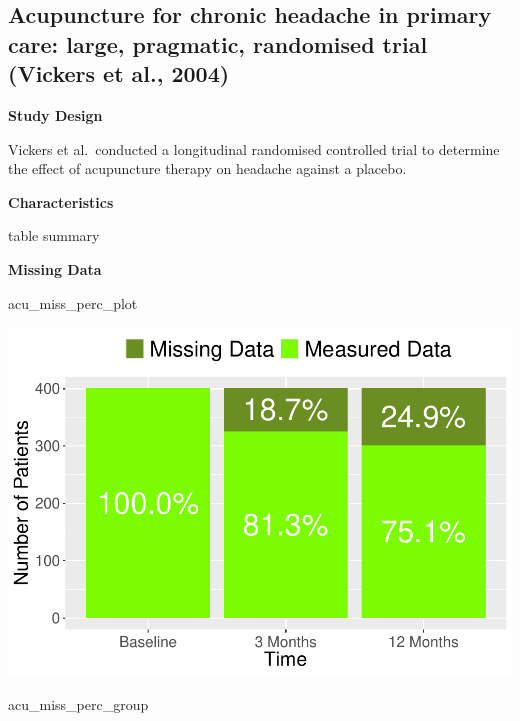 \documentclass{article}
\newenvironment{Shaded}{\begin{snugshade}}{\end{snugshade}}
\newcommand{\NormalTok}[1]{#1}
\newcommand{\pandocbounded}[1]{#1}
\begin{document}
\subsection{Acupuncture for chronic headache in primary care: large,
pragmatic, randomised trial (Vickers et al.,
2004)}\label{acupuncture-for-chronic-headache-in-primary-care-large-pragmatic-randomised-trial-vickers-et-al.-2004}

\textbf{Study Design}

Vickers et al.~conducted a longitudinal randomised controlled trial to
determine the effect of acupuncture therapy on headache against a
placebo.

\textbf{Characteristics}

table summary

\textbf{Missing Data}

\begin{Shaded}
\begin{Highlighting}[]
\NormalTok{acu\_miss\_perc\_plot}
\end{Highlighting}
\end{Shaded}

\pandocbounded{\includegraphics[keepaspectratio]{Final_Report_files/figure-latex/unnamed-chunk-1-1.pdf}}

\begin{Shaded}
\begin{Highlighting}[]
\NormalTok{acu\_miss\_perc\_group}
\end{Highlighting}
\end{Shaded}
\end{document}
